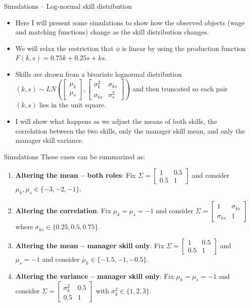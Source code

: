 \documentclass{beamer}
\begin{document}
	\begin{frame}{Simulations -- Log-normal skill distribution}
		\begin{itemize}
			\item Here I will present some simulations to show how the observed objects (wage and matching functions) change as the skill distribution changes.
			\bigskip
			\item We will relax the restriction that $\phi$ is linear by using the production function $F(k,s) = 0.75k + 0.25s + ks$.
			\bigskip
			\item  Skills are drawn from a bivariate lognormal distribution $(k,s) \sim LN\left(\begin{bmatrix}
				\mu_k \\ 
				\mu_s
			\end{bmatrix}, 
			\begin{bmatrix}
				\sigma^2_{k} & \sigma_{ks} \\
				\sigma_{ks} & \sigma^2_{s}
			\end{bmatrix}\right)$ and then truncated so each pair $(k,s)$ lies in the unit square.
			\bigskip
			\item I will show what happens as we adjust the means of both skills, the correlation between the two skills, only the manager skill mean, and only the manager skill variance.
		\end{itemize}

	\end{frame}
	
	\begin{frame}{Simulations}
		These cases can be summarized as:
		\begin{enumerate}
			\item \textbf{Altering the mean -- both roles}: Fix $\Sigma = \begin{bmatrix}
				1 & 0.5 \\
				0.5 & 1
			\end{bmatrix}$ and consider $\mu_k,\mu_s \in \{-3,-2,-1\}$.
			\item \textbf{Altering the correlation}: Fix $\mu_k = \mu_s = -1$ and consider $\Sigma = \begin{bmatrix}
				1 & \sigma_{ks} \\
				\sigma_{ks} & 1
			\end{bmatrix}$ where $\sigma_{ks}\in\{0.25,0.5,0.75\}$.
			\item \textbf{Altering the mean -- manager skill only}: Fix $\Sigma = \begin{bmatrix}
				1 & 0.5 \\
				0.5 & 1
			\end{bmatrix}$ and $\mu_s = -1$ and consider $\mu_k \in \{-1.5,-1,-0.5\}$.
			\item \textbf{Altering the variance -- manager skill only}: Fix $\mu_k = \mu_s = - 1$ and consider $\Sigma = \begin{bmatrix}
				\sigma^2_k & 0.5 \\
				0.5 & 1
			\end{bmatrix}$ with $\sigma^2_k \in \{1,2,3\}$.
		\end{enumerate}
	\end{frame}
	
\end{document}
